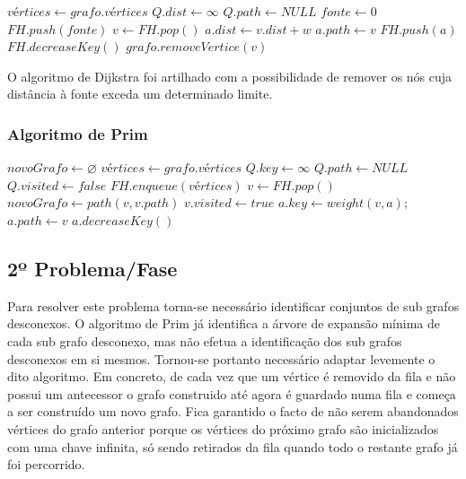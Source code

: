 \documentclass[a4paper,12pt,titlepage]{article}
\begin{document}
\begin{algorithmic}[1]
\State $vértices \gets grafo.vértices$
\State $Q.dist \gets \infty$
\State $Q.path \gets NULL$
\EndFor
\State $fonte \gets 0$
\State $FH.push(fonte)$
\State $v \gets FH.pop()$
	\State $a.dist \gets v.dist + w$
	\State $a.path \gets v$
		\State $FH.push(a)$
	\Else
		\State $FH.decreaseKey()$
	\EndIf
\EndIf
\EndFor
\EndWhile
\EndProcedure
{}
\State $grafo.removeVertice(v)$
\EndIf
\EndFor
\EndProcedure
\end{algorithmic}

O algoritmo de Dijkstra foi artilhado com a possibilidade de remover os nós cuja distância à fonte exceda um determinado limite.

\subsubsection{Algoritmo de Prim}
\begin{algorithmic}[1]
\State $novoGrafo \gets \varnothing$
\State $vértices \gets grafo.vértices$
\State $Q.key \gets \infty$
\State $Q.path \gets NULL$
\State $Q.visited \gets false$
\EndFor
\State $FH.enqueue(vértices)$
\State $v \gets FH.pop()$
\State $novoGrafo \gets path(v, v.path)$
\State $v.visited \gets true$
\State $a.key \gets weight(v,a)$;
\State $a.path \gets v$
\State $a.decreaseKey()$
\EndIf
\EndFor
\EndWhile
\EndProcedure

\end{algorithmic}


\subsection{2º Problema/Fase}
Para resolver este problema torna-se necessário identificar conjuntos de sub grafos desconexos. O algoritmo de Prim já identifica a árvore de expansão mínima de cada sub grafo desconexo, mas não efetua a identificação dos sub grafos desconexos em si mesmos. Tornou-se portanto necessário adaptar levemente o dito algoritmo. Em concreto, de cada vez que um vértice é removido da fila e não possui um antecessor o grafo construido até agora é guardado numa fila e começa a ser construído um novo grafo. Fica garantido o facto de não serem abandonados vértices do grafo anterior porque os vértices do próximo grafo são inicializados com uma chave infinita, só sendo retirados da fila quando todo o restante grafo já foi percorrido.
\end{document}
